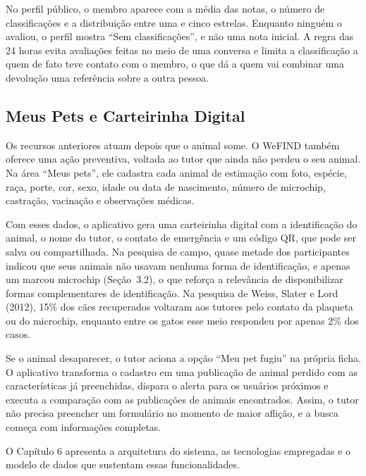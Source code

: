 No perfil público, o membro aparece com a média das notas, o número de classificações e a distribuição entre uma e cinco estrelas. Enquanto ninguém o avaliou, o perfil mostra ``Sem classificações'', e não uma nota inicial. A regra das 24 horas evita avaliações feitas no meio de uma conversa e limita a classificação a quem de fato teve contato com o membro, o que dá a quem vai combinar uma devolução uma referência sobre a outra pessoa.

\subsection{Meus Pets e Carteirinha Digital}\label{sec:meus_pets}

Os recursos anteriores atuam depois que o animal some. O WeFIND também oferece uma ação preventiva, voltada ao tutor que ainda não perdeu o seu animal. Na área ``Meus pets'', ele cadastra cada animal de estimação com foto, espécie, raça, porte, cor, sexo, idade ou data de nascimento, número de microchip, castração, vacinação e observações médicas.

Com esses dados, o aplicativo gera uma carteirinha digital com a identificação do animal, o nome do tutor, o contato de emergência e um código QR, que pode ser salva ou compartilhada. Na pesquisa de campo, quase metade dos participantes indicou que seus animais não usavam nenhuma forma de identificação, e apenas um marcou microchip (Seção~3.2), o que reforça a relevância de disponibilizar formas complementares de identificação. Na pesquisa de Weiss, Slater e Lord (2012), 15\% dos cães recuperados voltaram aos tutores pelo contato da plaqueta ou do microchip, enquanto entre os gatos esse meio respondeu por apenas 2\% dos casos.

Se o animal desaparecer, o tutor aciona a opção ``Meu pet fugiu'' na própria ficha. O aplicativo transforma o cadastro em uma publicação de animal perdido com as características já preenchidas, dispara o alerta para os usuários próximos e executa a comparação com as publicações de animais encontrados. Assim, o tutor não precisa preencher um formulário no momento de maior aflição, e a busca começa com informações completas.

O Capítulo 6 apresenta a arquitetura do sistema, as tecnologias empregadas e o modelo de dados que sustentam essas funcionalidades.
